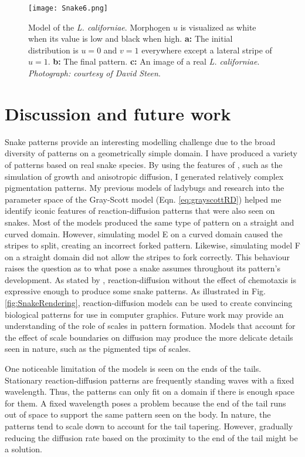 \begin{figure}[ht]
	\centering
	\texttt{[image: Snake6.png]}
	\caption{Model of the \textit{L. californiae}. Morphogen $u$ is visualized as white when its value is low and black when high. \textbf{a:} The initial distribution is $u=0$ and $v=1$ everywhere except a lateral stripe  of $u=1$. \textbf{b:} The final pattern. \textbf{c:} An image of a real \textit{L. californiae}. \textit{Photograph: courtesy of David Steen}.}
	\label{fig:Snake6}
\end{figure}

\newpage

\section{Discussion and future work}
Snake patterns provide an interesting modelling challenge due to the broad diversity of patterns on a geometrically simple domain. I have produced a variety of patterns based on real snake species. By using the features of \ProgramName{}, such as the simulation of growth and anisotropic diffusion, I generated relatively complex pigmentation patterns. My previous models of ladybugs and research into the parameter space of the Gray-Scott model (Eqn. \ref{eq:grayscottRD}) helped me identify iconic features of reaction-diffusion patterns that were also seen on snakes. Most of the models produced the same type of pattern on a straight and curved domain. However, simulating model E on a curved domain caused the stripes to split, creating an incorrect forked pattern. Likewise, simulating model F on a straight domain did not allow the stripes to fork correctly. This behaviour raises the question as to what pose a snake assumes throughout its pattern's development. As stated by \citet{murray1991}, reaction-diffusion without the effect of chemotaxis is expressive enough to produce some snake patterns. As illustrated in Fig. \ref{fig:SnakeRendering}, reaction-diffusion models can be used to create convincing biological patterns for use in computer graphics. Future work may provide an understanding of the role of scales in pattern formation. Models that account for the effect of scale boundaries on diffusion may produce the more delicate details seen in nature, such as the pigmented tips of scales. 

One noticeable limitation of the models is seen on the ends of the tails. Stationary reaction-diffusion patterns are frequently standing waves with a fixed wavelength. Thus, the patterns can only fit on a domain if there is enough space for them. A  fixed wavelength poses a problem because the end of the tail runs out of space to support the same pattern seen on the body. In nature, the patterns tend to scale down to account for the tail tapering. However, gradually reducing the diffusion rate based on the proximity to the end of the tail might be a solution.

